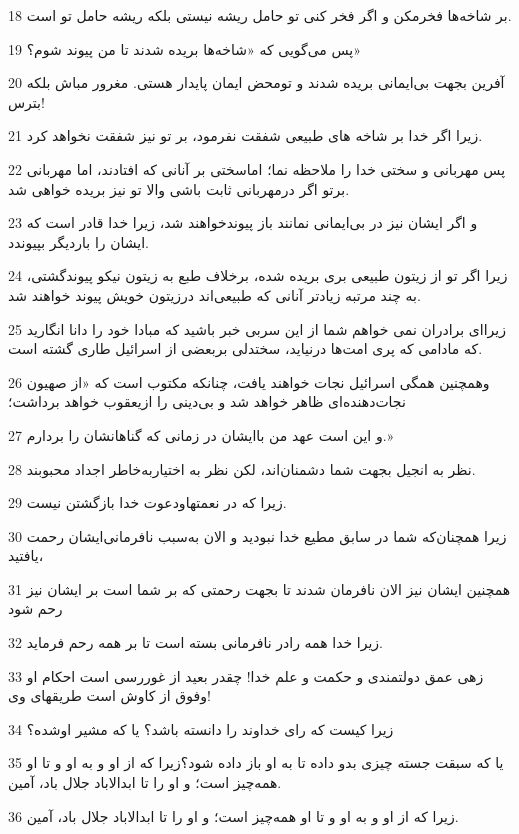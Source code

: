 \par 18 بر شاخه‌ها فخرمکن و اگر فخر کنی تو حامل ریشه نیستی بلکه ریشه حامل تو است.
\par 19 پس می‌گویی که «شاخه‌ها بریده شدند تا من پیوند شوم؟»
\par 20 آفرین بجهت بی‌ایمانی بریده شدند و تومحض ایمان پایدار هستی. مغرور مباش بلکه بترس!
\par 21 زیرا اگر خدا بر شاخه های طبیعی شفقت نفرمود، بر تو نیز شفقت نخواهد کرد.
\par 22 پس مهربانی و سختی خدا را ملاحظه نما؛ اماسختی بر آنانی که افتادند، اما مهربانی برتو اگر درمهربانی ثابت باشی والا تو نیز بریده خواهی شد.
\par 23 و اگر ایشان نیز در بی‌ایمانی نمانند باز پیوندخواهند شد، زیرا خدا قادر است که ایشان را باردیگر بپیوندد.
\par 24 زیرا اگر تو از زیتون طبیعی بری بریده شده، برخلاف طبع به زیتون نیکو پیوندگشتی، به چند مرتبه زیادتر آنانی که طبیعی‌اند درزیتون خویش پیوند خواهند شد.
\par 25 زیرا‌ای برادران نمی خواهم شما از این سربی خبر باشید که مبادا خود را دانا انگارید که مادامی که پری امت‌ها درنیاید، سختدلی بربعضی از اسرائیل طاری گشته است.
\par 26 وهمچنین همگی اسرائیل نجات خواهند یافت، چنانکه مکتوب است که «از صهیون نجات‌دهنده‌ای ظاهر خواهد شد و بی‌دینی را ازیعقوب خواهد برداشت؛
\par 27 و این است عهد من باایشان در زمانی که گناهانشان را بردارم.»
\par 28 نظر به انجیل بجهت شما دشمنان‌اند، لکن نظر به اختیاربه‌خاطر اجداد محبوبند.
\par 29 زیرا که در نعمتهاودعوت خدا بازگشتن نیست.
\par 30 زیرا همچنان‌که شما در سابق مطیع خدا نبودید و الان به‌سبب نافرمانی‌ایشان رحمت یافتید،
\par 31 همچنین ایشان نیز الان نافرمان شدند تا بجهت رحمتی که بر شما است بر ایشان نیز رحم شود
\par 32 زیرا خدا همه رادر نافرمانی بسته است تا بر همه رحم فرماید.
\par 33 زهی عمق دولتمندی و حکمت و علم خدا! چقدر بعید از غوررسی است احکام او وفوق از کاوش است طریقهای وی!
\par 34 زیرا کیست که رای خداوند را دانسته باشد؟ یا که مشیر اوشده؟
\par 35 یا که سبقت جسته چیزی بدو داده تا به او باز داده شود؟زیرا که از او و به او و تا او همه‌چیز است؛ و او را تا ابدالاباد جلال باد، آمین.
\par 36 زیرا که از او و به او و تا او همه‌چیز است؛ و او را تا ابدالاباد جلال باد، آمین.

